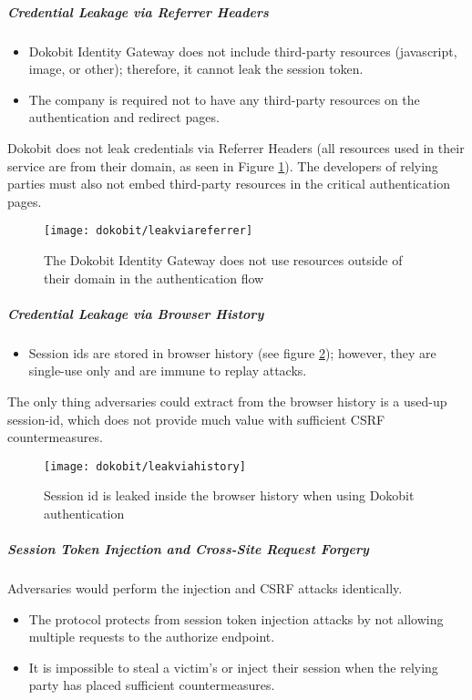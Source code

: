 \subparagraph{Credential Leakage via Referrer Headers}

\begin{itemize}
  \item Dokobit Identity Gateway does not include third-party resources (javascript, image, or other); therefore, it cannot leak the session token.
  \item The company is required not to have any third-party resources on the authentication and redirect pages.
\end{itemize}

Dokobit does not leak credentials via Referrer Headers (all resources used in their service are from their domain, as seen in Figure \ref{fig:dokobit-leakviareferrer}). The developers of relying parties must also not embed third-party resources in the critical authentication pages.

\begin{figure}
  \centering
  \texttt{[image: dokobit/leakviareferrer]}
  \caption{The Dokobit Identity Gateway does not use resources outside of their domain in the authentication flow}
  \label{fig:dokobit-leakviareferrer}
\end{figure}

\subparagraph{Credential Leakage via Browser History}

\begin{itemize}
  \item Session ids are stored in browser history (see figure \ref{fig:dokobit-leakviahistory}); however, they are single-use only and are immune to replay attacks.
\end{itemize}

The only thing adversaries could extract from the browser history is a used-up session-id, which does not provide much value with sufficient CSRF countermeasures.

\begin{figure}
  \centering
  \texttt{[image: dokobit/leakviahistory]}
  \caption{Session id is leaked inside the browser history when using Dokobit authentication}
  \label{fig:dokobit-leakviahistory}
\end{figure}

\subparagraph{Session Token Injection and Cross-Site Request Forgery}

Adversaries would perform the injection and CSRF attacks identically.

\begin{itemize}
  \item The protocol protects from session token injection attacks by not allowing multiple requests to the {authorize} endpoint.
  \item It is impossible to steal a victim's or inject their session when the relying party has placed sufficient countermeasures.
\end{itemize}

